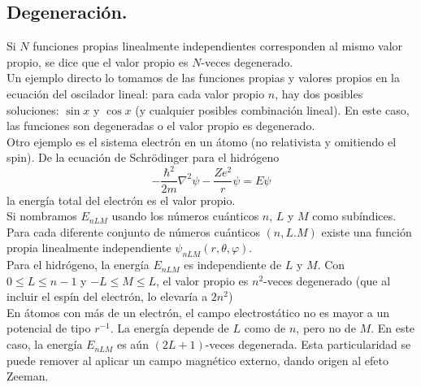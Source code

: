 \subsection{Degeneración.}
Si $N$ funciones propias linealmente independientes corresponden al mismo valor propio, se dice que el valor propio es $N$-veces degenerado.
\\
Un ejemplo directo lo tomamos de las funciones propias y valores propios en la ecuación del oscilador lineal: para cada valor propio $n$, hay dos posibles soluciones: $\sin x$ y $\cos x$ (y cualquier posibles combinación lineal). En este caso, las funciones son degeneradas o el valor propio es degenerado.
\\
Otro ejemplo es el sistema electrón en un átomo (no relativista y omitiendo el spin). De la ecuación de Schrödinger para el hidrógeno
\[ - \dfrac{\hbar^{2}}{2m} \nabla^{2} \psi - \dfrac{Z e^{2}}{r} \psi =  E \psi \]
la energía total del electrón es el valor propio.
\\
Si nombramos $E_{nLM}$ usando los números cuánticos $n$, $L$ y $M$ como subíndices. Para cada diferente conjunto de números cuánticos $(n,L.M)$ existe una función propia linealmente independiente $\psi_{nLM}(r,\theta, \varphi)$.
\\
Para el hidrógeno, la energía $E_{nLM}$ es independiente de $L$ y $M$. Con $0 \leq L \leq n-1$ y $-L \leq M \leq L$, el valor propio es $n^{2}$-veces degenerado (que al incluir el espín del electrón, lo elevaría a $2n^{2}$)
\\
En átomos con más de un electrón, el campo electrostático no es mayor a un potencial de tipo $r^{-1}$. La energía depende de $L$ como de $n$, pero no de $M$. En este caso, la energía $E_{nLM}$ es aún $(2L+1)$-veces degenerada. Esta particularidad se puede remover al aplicar un campo magnético externo, dando origen al efeto Zeeman.

